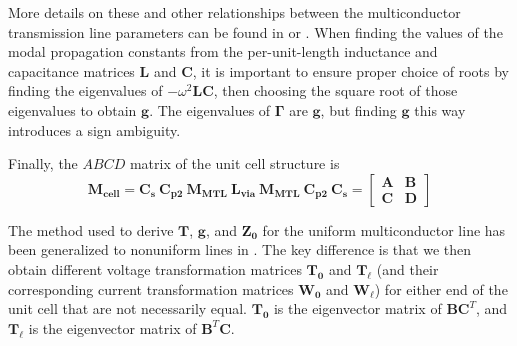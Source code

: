 \documentclass{allertonproc}
\begin{document}
More details on these and other relationships between the multiconductor transmission line parameters can be found in \cite{fariabook} or \cite{paulbook}.  When finding the values of the modal propagation constants from the per-unit-length inductance and capacitance matrices $\mathbf{L}$ and $\mathbf{C}$, it is important to ensure proper choice of roots by finding the eigenvalues of $-\omega^2\mathbf{LC}$, then choosing the square root of those eigenvalues to obtain $\mathbf{g}$.  The eigenvalues of $\mathbf{\Gamma}$ are $\mathbf{g}$, but finding $\mathbf{g}$ this way introduces a sign ambiguity.

Finally, the $ABCD$ matrix of the unit cell structure is 
\begin{equation}
\mathbf{M_{cell}} = \mathbf{C_s}\ \mathbf{C_{p2}} \ \mathbf{M_{MTL}} \ \mathbf{L_{via}} \ \mathbf{M_{MTL}} \ \mathbf{C_{p2}} \ \mathbf{C_s} = \begin{bmatrix} \mathbf{A} & \mathbf{B} \\ \mathbf{C} & \mathbf{D} \end{bmatrix}
\end{equation}

The method used to derive $\mathbf{T}$, $\mathbf{g}$, and $\mathbf{Z_0}$ for the uniform multiconductor line has been generalized to nonuniform lines in \cite{faria2004}.  The key difference is that we then obtain different voltage transformation matrices $\mathbf{T_0}$ and $\mathbf{T_\ell}$ (and their corresponding current transformation matrices $\mathbf{W_0}$ and $\mathbf{W_\ell}$)  for either end of the unit cell that are not necessarily equal.  $\mathbf{T_0}$ is the eigenvector matrix of $\mathbf{B}\mathbf{C}^T$, and $\mathbf{T_\ell}$ is the eigenvector matrix of $\mathbf{B}^T\mathbf{C}$.
\end{document}
